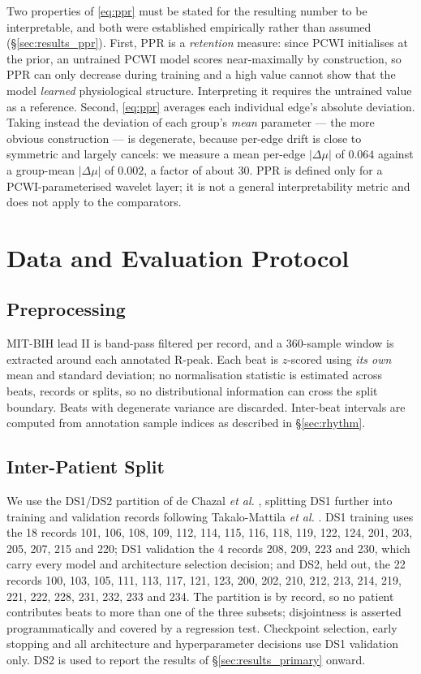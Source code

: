 \documentclass[journal,twoside,web]{ieeecolor}
\begin{document}
Two properties of \eqref{eq:ppr} must be stated for the resulting number to be interpretable, and both were established empirically rather than assumed (\S\ref{sec:results_ppr}). First, PPR is a \emph{retention} measure: since PCWI initialises at the prior, an untrained PCWI model scores near-maximally by construction, so PPR can only decrease during training and a high value cannot show that the model \emph{learned} physiological structure. Interpreting it requires the untrained value as a reference. Second, \eqref{eq:ppr} averages each individual edge's absolute deviation. Taking instead the deviation of each group's \emph{mean} parameter --- the more obvious construction --- is degenerate, because per-edge drift is close to symmetric and largely cancels: we measure a mean per-edge $|\Delta\mu|$ of $0.064$ against a group-mean $|\Delta\mu|$ of $0.002$, a factor of about 30. PPR is defined only for a PCWI-parameterised wavelet layer; it is not a general interpretability metric and does not apply to the comparators.

\section{Data and Evaluation Protocol}

\subsection{Preprocessing}
\label{sec:preprocessing}
MIT-BIH \cite{moody_impact_2001, goldberger_physiobank_2000} lead II is band-pass filtered per record, and a 360-sample window is extracted around each annotated R-peak. Each beat is $z$-scored using \emph{its own} mean and standard deviation; no normalisation statistic is estimated across beats, records or splits, so no distributional information can cross the split boundary. Beats with degenerate variance are discarded. Inter-beat intervals are computed from annotation sample indices as described in \S\ref{sec:rhythm}.

\subsection{Inter-Patient Split}
\label{sec:split}
We use the DS1/DS2 partition of de Chazal \emph{et al.} \cite{chazal_automatic_2004}, splitting DS1 further into training and validation records following Takalo-Mattila \emph{et al.} \cite{takalo-mattila_inter-patient_2018}. DS1 training uses the 18 records 101, 106, 108, 109, 112, 114, 115, 116, 118, 119, 122, 124, 201, 203, 205, 207, 215 and 220; DS1 validation the 4 records 208, 209, 223 and 230, which carry every model and architecture selection decision; and DS2, held out, the 22 records 100, 103, 105, 111, 113, 117, 121, 123, 200, 202, 210, 212, 213, 214, 219, 221, 222, 228, 231, 232, 233 and 234. The partition is by record, so no patient contributes beats to more than one of the three subsets; disjointness is asserted programmatically and covered by a regression test. Checkpoint selection, early stopping and all architecture and hyperparameter decisions use DS1 validation only. DS2 is used to report the results of \S\ref{sec:results_primary} onward.
\end{document}
